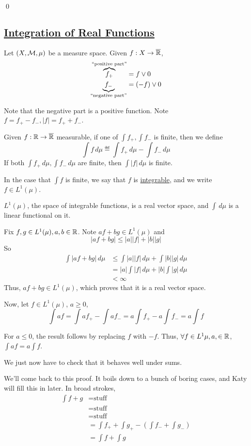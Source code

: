 \documentclass[x11names,reqno,14pt]{extarticle}
\newcommand*{\oo}{\infty}
\newcommand{\barr}{{\bar{\R}}}
\begin{document}
\qed

\subsection*{\underline{Integration of Real Functions}}

Let $(X, \mathcal{M}, \mu)$ be a measure space. Given $f:X\to\barr$, 
\begin{align*}
\overbrace{f_+}^{``\text{positive part}"} & = f \vee 0 \\
\underbrace{f_-}_{``\text{negative part}"} & = (-f)\vee 0 \\
\end{align*}

Note that the negative part is a positive function. Note $f = f_+ - f_-, |f| = f_+ + f_-$.


Given $f:\R\to\barr$ measurable, if one of $\int f_+, \int f_-$ is finite, then we define
\[
\int f\,d\mu \eqdef \int f_+\,d\mu - \int f_-\,d\mu
\]
If both $\int f_+\,d\mu, \int f_-\,d\mu$ are finite, then $\int|f|\,d\mu$ is finite. 

In the case that $\int f$ is finite, we say that $f$ is \underline{integrable}, and we write $f \in L^1(\mu)$. 

\prop

$L^1(\mu)$, the space of integrable functions, is a real vector space, and $\int\,d\mu$ is a linear functional on it. 

\proof

Fix $f, g\in L^1(\mu), a, b \in \mathbb{R}$. Note $af + bg \in L^1(\mu)$ and 
\[
|af + bg| \leq |a||f| + |b||g|
\]
So
\begin{align*}
\int|af + bg|\,d\mu & \leq \int|a||f|\,d\mu + \int|b||g|\,d\mu \\ & = |a|\int|f|\,d\mu + |b|\int|g|\,d\mu \\ & < \oo
\end{align*}
Thus, $af + bg \in L^1(\mu)$, which proves that it is a real vector space. 

Now, let $f \in L^1(\mu)$, $a \geq 0$, 
\[
\int af = \int af_+ - \int af_- = a\int f_+ - a\int f_- = a\int f
\]

For $a \leq 0$, the result follows by replacing $f$ with $-f$. Thus, $\forall f\in L^1\mu, a, \in \mathbb{R}$, $\int af = a\int f$. 

We just now have to check that it behaves well under sums. 

We'll come back to this proof. It boils down to a bunch of boring cases, and Katy will fill this in later. In broad strokes,
\begin{align*}
\int f + g & = \text{stuff} \\ & = \text{stuff} \\ & = \text{stuff}\\ & = \int f_+ + \int g_+ - \left(\int f_- + \int g_-\right) \\ & = \int f + \int g \\
\end{align*}
\end{document}

